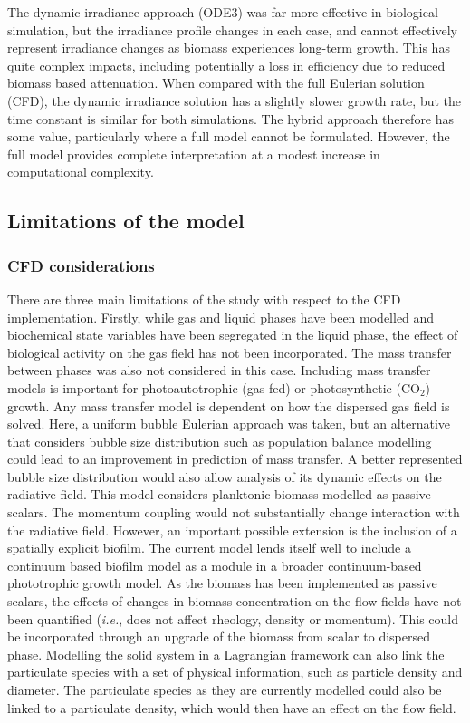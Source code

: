 The dynamic irradiance approach (ODE3) was far more effective in biological simulation, but the irradiance profile changes in each case, and cannot effectively represent irradiance changes as biomass experiences long-term growth. This has quite complex impacts, including potentially a loss in efficiency due to reduced biomass based attenuation. When compared with the full Eulerian solution (CFD), the dynamic irradiance solution has a slightly slower growth rate, but the time constant is similar for both simulations. The hybrid approach therefore has some value, particularly where a full model cannot be formulated. However, the full model provides complete interpretation at a modest increase in computational complexity. 

\subsection{Limitations of the model}
\label{ssec:limitations}
\subsubsection{CFD considerations}
There are three main limitations of the study with respect to the CFD implementation. Firstly, while gas and liquid phases have been modelled and biochemical state variables have been segregated in the liquid phase, the effect of biological activity on the gas field has not been incorporated. The mass transfer between phases was also not considered in this case. Including mass transfer models is important for photoautotrophic (gas fed) or photosynthetic ($\mathrm{CO_2}$) growth. Any mass transfer model is dependent on how the dispersed gas field is solved. Here, a uniform bubble Eulerian approach was taken, but an alternative that considers bubble size distribution such as population balance modelling could lead to an improvement in prediction of mass transfer. A better represented bubble size distribution would also allow analysis of its dynamic effects on the radiative field.  
This model considers planktonic biomass modelled as passive scalars. The momentum coupling would not substantially change interaction with the radiative field. However, an important possible extension is the inclusion of a spatially explicit biofilm. The current model lends itself well to include a continuum based biofilm model as a module in a broader continuum-based phototrophic growth model. 
\skippingparagraph
As the biomass has been implemented as passive scalars, the effects of changes in biomass concentration on the flow fields have not been quantified (\textit{i.e.}, does not affect rheology, density or momentum). This could be incorporated through an upgrade of the biomass from scalar to dispersed phase. Modelling the solid system in a Lagrangian framework can also link the particulate species with a set of physical information, such as particle density and diameter. The particulate species as they are currently modelled could also be linked to a particulate density, which would then have an effect on the flow field. 

